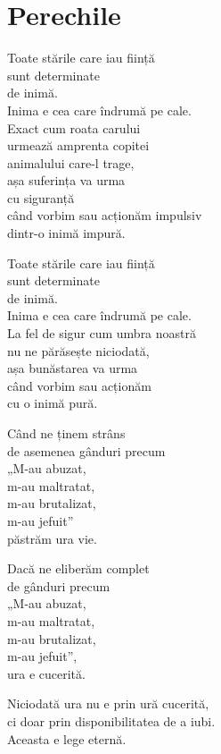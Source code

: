 
\chapter{Perechile}

Toate stările care iau ființă\\
sunt determinate\\
de inimă.\\
Inima e cea care îndrumă pe cale.\\
Exact cum roata carului\\
urmează amprenta copitei\\
animalului care-l trage,\\
așa suferința va urma\\
cu siguranță\\
când vorbim sau acționăm impulsiv\\
dintr-o inimă impură.


Toate stările care iau ființă\\
sunt determinate\\
de inimă.\\
Inima e cea care îndrumă pe cale.\\
La fel de sigur cum umbra noastră\\
nu ne părăsește niciodată,\\
așa bunăstarea va urma\\
când vorbim sau acționăm\\
cu o inimă pură.


Când ne ținem strâns\\
de asemenea gânduri precum\\
„M-au abuzat,\\
m-au maltratat,\\
m-au brutalizat,\\
m-au jefuit”\\
păstrăm ura vie.


Dacă ne eliberăm complet\\
de gânduri precum\\
„M-au abuzat,\\
m-au maltratat,\\
m-au brutalizat,\\
m-au jefuit”,\\
ura e cucerită.


Niciodată ura nu e prin ură cucerită,\\
ci doar prin disponibilitatea de a iubi.\\
Aceasta e lege eternă.

